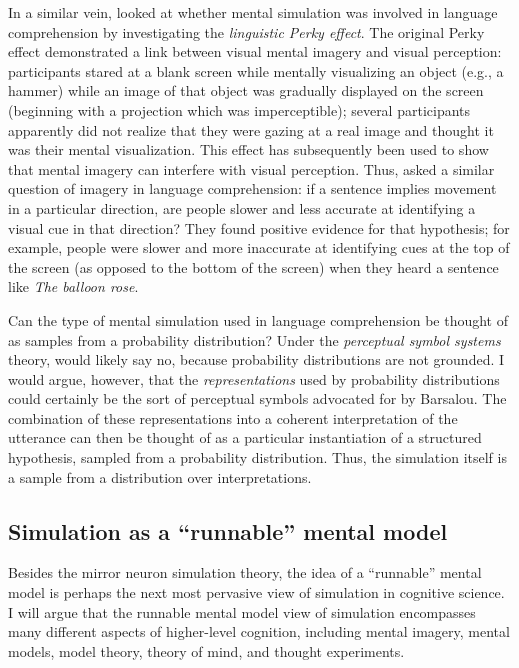 \documentclass[12pt]{article}
\begin{document}
In a similar vein, \cite{Bergen2007} looked at whether mental simulation was involved in language comprehension by investigating the \textit{linguistic Perky effect}. The original Perky effect demonstrated a link between visual mental imagery and visual perception: participants stared at a blank screen while mentally visualizing an object (e.g., a hammer) while an image of that object was gradually displayed on the screen (beginning with a projection which was imperceptible); several participants apparently did not realize that they were gazing at a real image and thought it was their mental visualization. This effect has subsequently been used to show that mental imagery can interfere with visual perception. Thus, \cite{Bergen2007} asked a similar question of imagery in language comprehension: if a sentence implies movement in a particular direction, are people slower and less accurate at identifying a visual cue in that direction? They found positive evidence for that hypothesis; for example, people were slower and more inaccurate at identifying cues at the top of the screen (as opposed to the bottom of the screen) when they heard a sentence like \textit{The balloon rose}.

Can the type of mental simulation used in language comprehension be thought of as samples from a probability distribution? Under the \textit{perceptual symbol systems} theory, \cite{Barsalou1999} would likely say no, because probability distributions are not grounded. I would argue, however, that the \textit{representations} used by probability distributions could certainly be the sort of perceptual symbols advocated for by Barsalou. The combination of these representations into a coherent interpretation of the utterance can then be thought of as a particular instantiation of a structured hypothesis, sampled from a probability distribution. Thus, the simulation itself is a sample from a distribution over interpretations.

\subsection*{Simulation as a ``runnable'' mental model}

Besides the mirror neuron simulation theory, the idea of a ``runnable'' mental model \cite{Craik1943} is perhaps the next most pervasive view of simulation in cognitive science. I will argue that the runnable mental model view of simulation encompasses many different aspects of higher-level cognition, including mental imagery, mental models, model theory, theory of mind, and thought experiments.
\end{document}
